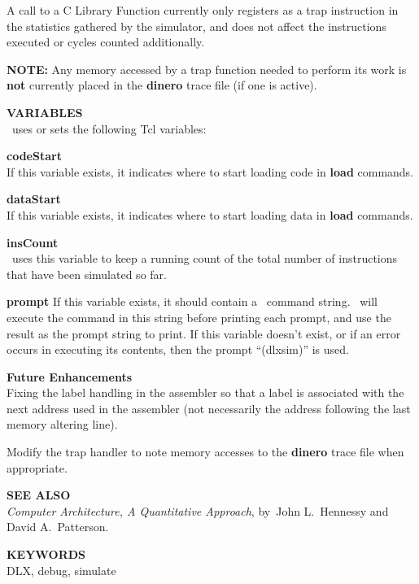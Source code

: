 \begin{mylist}
A call to a C Library Function currently only registers as a trap
instruction in the statistics gathered by the simulator, and does
not affect the instructions executed or cycles counted additionally.

{\bf NOTE:} Any memory accessed by a trap function needed to perform
its work is {\bf not} currently placed in the {\bf dinero} trace file
(if one is active).

\item[{\bf VARIABLES}]
\nopagebreak \hfill \\
\dlxsim\ uses or sets the following Tcl variables:

\begin{mylist}
\item[{\bf codeStart}]
\nopagebreak \hfill \\
If this variable exists, it indicates where to start loading code in
{\bf load} commands.

\item[{\bf dataStart}]
\nopagebreak \hfill \\
If this variable exists, it indicates where to start loading data in
{\bf load} commands.

\item[{\bf insCount}]
\nopagebreak \hfill \\
\dlxsim\ uses this variable to keep a running count of the total number
of instructions that have been simulated so far.

\item[{\bf prompt}\hfill]
If this variable exists, it should contain a \dlxsim\ command string.
\dlxsim\ will execute the command in this string before printing each
prompt, and use the result as the prompt string to print.  If this
variable doesn't exist, or if an error occurs in executing its
contents, then the prompt ``(dlxsim)'' is used.
\end{mylist}

\item[{\bf Future Enhancements}]
\nopagebreak \hfill \\
Fixing the label handling in the assembler so that a label is
associated with the next address used in the assembler (not
necessarily the address following the last memory altering line).

Modify the trap handler to note memory accesses to the {\bf dinero}
trace file when appropriate.

\item[{\bf SEE ALSO}]
\nopagebreak \hfill \\
{\em Computer Architecture, A Quantitative Approach}, by~John L.~Hennessy and David A.~Patterson.

\item[{\bf KEYWORDS}]
\nopagebreak \hfill \\
DLX, debug, simulate

\end{mylist}
